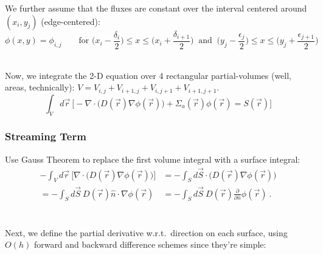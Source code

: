 \documentclass[12pt, answers]{exam}
\begin{document}
We further assume that the fluxes are constant over the interval centered around $(x_i, y_j)$ (edge-centered):
%
\ifprintanswers
\[\phi(x,y) = \phi_{i,j} \qquad \text{for } \bigl(x_i - \frac{\delta_i}{2}\bigr) \leq x \leq \bigl(x_i + \frac{\delta_{i+1}}{2}\bigr) \:\text{ and }\:\bigl(y_j - \frac{\epsilon_j}{2}\bigr) \leq x \leq \bigl(y_j + \frac{\epsilon_{j+1}}{2}\bigr) \]
\else
\\ \vspace*{3em}
\fi

Now, we integrate the 2-D equation over 4 rectangular partial-volumes (well, areas, technically): $V = V_{i,j} + V_{i+1,j} + V_{i,j+1} + V_{i+1,j+1}$.
%
\[\int_V d\vec{r}\:\bigl[-\nabla \cdot \bigl(D(\vec{r})\nabla \phi(\vec{r})\bigr) +\Sigma_a(\vec{r}) \phi(\vec{r}) = S(\vec{r}) \bigr]\]


\subsubsection*{Streaming Term}
Use Gauss Theorem to replace the first volume integral with a surface integral:
%
\ifprintanswers
\begin{align}
-\int_V d\vec{r}\:\bigl[\nabla \cdot \bigl(D(\vec{r})\nabla \phi(\vec{r})\bigr)\bigr] &= -\int_S d\vec{S} \cdot\bigl(D(\vec{r})\nabla \phi(\vec{r})\bigr) \nonumber \\
%
= -\int_S d\vec{S}\: D(\vec{r})\hat{n} \cdot \nabla \phi(\vec{r}) &= -\int_S d\vec{S} \:D(\vec{r})\frac{\partial}{\partial \hat{n}}\phi(\vec{r})\:. \nonumber
\end{align}
\else
\\ \vspace*{4em} \\
\fi
%
Next, we define the partial derivative w.r.t.\ direction on each surface, using $O(h)$ forward and backward difference schemes since they're simple:
\end{document}
